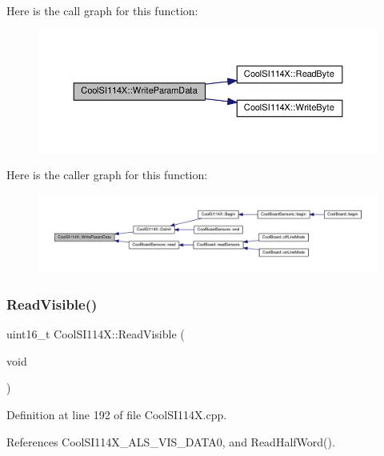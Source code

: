 Here is the call graph for this function\+:\nopagebreak
\begin{figure}[H]
\begin{center}
\leavevmode
\includegraphics[width=350pt]{dd/d67/class_cool_s_i114_x_abf45eb10a6de1be16e68a51624fa2608_cgraph}
\end{center}
\end{figure}
Here is the caller graph for this function\+:\nopagebreak
\begin{figure}[H]
\begin{center}
\leavevmode
\includegraphics[width=350pt]{dd/d67/class_cool_s_i114_x_abf45eb10a6de1be16e68a51624fa2608_icgraph}
\end{center}
\end{figure}
\mbox{\label{class_cool_s_i114_x_a42e0e574256341443c647a4c0eda87d5}} 
\subsubsection{\texorpdfstring{Read\+Visible()}{ReadVisible()}}
{\footnotesize\ttfamily uint16\+\_\+t Cool\+S\+I114\+X\+::\+Read\+Visible (\begin{DoxyParamCaption}\item[{void}]{ }\end{DoxyParamCaption})}



Definition at line 192 of file Cool\+S\+I114\+X.\+cpp.



References Cool\+S\+I114\+X\+\_\+\+A\+L\+S\+\_\+\+V\+I\+S\+\_\+\+D\+A\+T\+A0, and Read\+Half\+Word().



